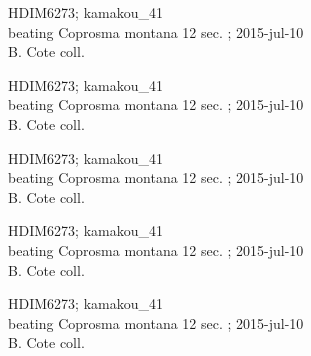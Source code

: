 \documentclass[2pt]{extarticle}
\begin{document}
\noindent
\parbox{0.16\textwidth}{\tiny \raggedright \rule[-0.3\baselineskip]{0pt}{10pt}HDIM6273; kamakou\_41\\ beating Coprosma montana 12 sec. ; 2015-jul-10\\ B. Cote coll.}
\parbox{0.16\textwidth}{\tiny \raggedright \rule[-0.3\baselineskip]{0pt}{10pt}HDIM6273; kamakou\_41\\ beating Coprosma montana 12 sec. ; 2015-jul-10\\ B. Cote coll.}
\parbox{0.16\textwidth}{\tiny \raggedright \rule[-0.3\baselineskip]{0pt}{10pt}HDIM6273; kamakou\_41\\ beating Coprosma montana 12 sec. ; 2015-jul-10\\ B. Cote coll.}
\parbox{0.16\textwidth}{\tiny \raggedright \rule[-0.3\baselineskip]{0pt}{10pt}HDIM6273; kamakou\_41\\ beating Coprosma montana 12 sec. ; 2015-jul-10\\ B. Cote coll.}
\parbox{0.16\textwidth}{\tiny \raggedright \rule[-0.3\baselineskip]{0pt}{10pt}HDIM6273; kamakou\_41\\ beating Coprosma montana 12 sec. ; 2015-jul-10\\ B. Cote coll.}
\end{document}
